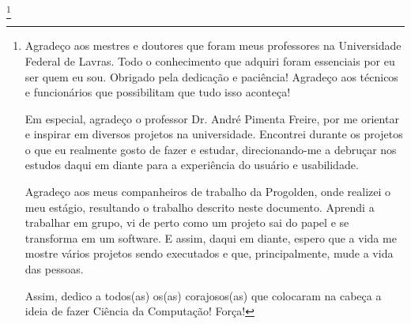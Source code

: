\documentclass{uflamon}          %
\begin{document}
\thanks{
Agradeço aos mestres e doutores que foram meus professores na Universidade Federal de Lavras. Todo o conhecimento que adquiri foram essenciais por eu ser quem eu sou. Obrigado pela dedicação e paciência! Agradeço aos técnicos e funcionários que possibilitam que tudo isso  aconteça!

Em especial, agradeço o professor Dr. André Pimenta Freire, por me orientar e inspirar em diversos projetos na universidade. Encontrei durante os projetos o que eu realmente gosto de fazer e estudar, direcionando-me a debruçar nos estudos daqui em diante para a experiência do usuário e usabilidade. 

Agradeço aos meus companheiros de trabalho da Progolden, onde realizei o meu estágio, resultando o trabalho descrito neste documento. Aprendi a trabalhar em grupo, vi de perto como um projeto sai do papel e se transforma em um software. E assim, daqui em diante, espero que a vida me mostre vários projetos sendo executados e que, principalmente, mude a vida das pessoas.

Assim, dedico a todos(as) os(as) corajosos(as) que colocaram na cabeça a ideia de fazer Ciência da Computação! Força!
}



	



\end{document}

